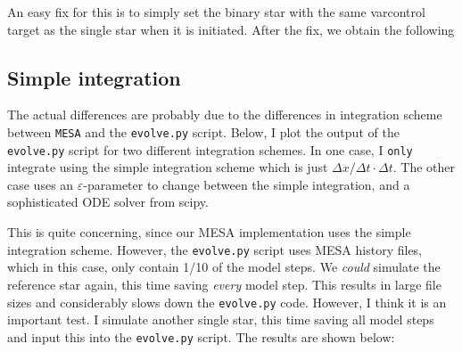 \documentclass[a4paper,10pt]{article}
\begin{document}
\begin{figure}[ht]
    \centering
\end{figure}

An easy fix for this is to simply set the binary star with the same varcontrol target as the single star when it is initiated. After the fix, we obtain the following
\begin{figure}[ht]
    \centering
\end{figure}



\subsection{Simple integration}
The actual differences are probably due to the differences in integration scheme between \lstinline[style=output, breaklines=true]|MESA| and the \lstinline[style=output, breaklines=true]|evolve.py| script. Below, I plot the output of the \lstinline[style=output, breaklines=true]|evolve.py| script for two different integration schemes. In one case, I \lstinline[style=output, breaklines=true]|only| integrate using the simple integration scheme which is just \(\Delta x / \Delta t \cdot  \Delta t\). The other case uses an \(\varepsilon \)-parameter to change between the simple integration, and a sophisticated ODE solver from scipy.

\begin{figure}[ht]
    \centering
\end{figure}

This is quite concerning, since our MESA implementation uses the simple integration scheme. However, the \texttt{evolve.py} script uses MESA history files, which in this case, only contain 1/10 of the model steps. We \emph{could} simulate the reference star again, this time saving \emph{every} model step. This results in large file sizes and considerably slows down the \texttt{evolve.py} code. However, I think it is an important test.
\nextpage
I simulate another single star, this time saving all model steps and input this into the \texttt{evolve.py} script. The results are shown below:
\end{document}
